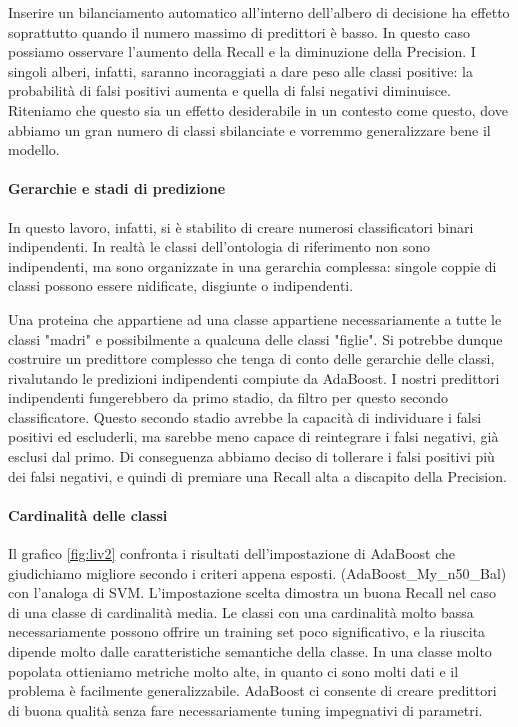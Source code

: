 \documentclass[12pt,a4paper,oneside,hidelinks]{report}
\begin{document}
Inserire un bilanciamento automatico all'interno dell'albero di decisione ha effetto soprattutto quando il numero massimo di predittori è basso. In questo caso possiamo osservare l'aumento della Recall e la diminuzione della Precision. I singoli alberi, infatti, saranno incoraggiati a dare peso alle classi positive: la probabilità di falsi positivi aumenta e quella di falsi negativi diminuisce. Riteniamo che questo sia un effetto desiderabile in un contesto come questo, dove abbiamo un gran numero di classi sbilanciate e vorremmo generalizzare bene il modello. 

\paragraph{Gerarchie e stadi di predizione}
In questo lavoro, infatti, si è stabilito di creare numerosi classificatori binari indipendenti. In realtà le classi dell'ontologia di riferimento non sono indipendenti, ma sono organizzate in una gerarchia complessa: singole coppie di classi possono essere nidificate, disgiunte o indipendenti.

Una proteina che appartiene ad una classe appartiene necessariamente a tutte le classi "madri" e possibilmente a qualcuna delle classi "figlie". Si potrebbe dunque costruire un predittore complesso che tenga di conto delle gerarchie delle classi, rivalutando le predizioni indipendenti compiute da AdaBoost. I nostri predittori indipendenti fungerebbero da primo stadio, da filtro per questo secondo classificatore.
Questo secondo stadio avrebbe la capacità di individuare i falsi positivi ed escluderli, ma sarebbe meno capace di reintegrare i falsi negativi, già esclusi dal primo. Di conseguenza abbiamo deciso di tollerare i falsi positivi più dei falsi negativi, e quindi di premiare una Recall alta a discapito della Precision.

\paragraph{Cardinalità delle classi}
Il grafico \ref{fig:liv2} confronta i risultati dell'impostazione di AdaBoost che giudichiamo migliore secondo i criteri appena esposti. (AdaBoost\_My\_n50\_Bal) con l'analoga di SVM. L'impostazione scelta dimostra un buona Recall nel caso di una classe di cardinalità media. Le classi con una cardinalità molto bassa necessariamente possono offrire un training set poco significativo, e la riuscita dipende molto dalle caratteristiche semantiche della classe. In una classe molto popolata ottieniamo metriche molto alte, in quanto ci sono molti dati e il problema è facilmente generalizzabile. AdaBoost ci consente di creare predittori di buona qualità senza fare necessariamente tuning impegnativi di parametri.
\end{document}
